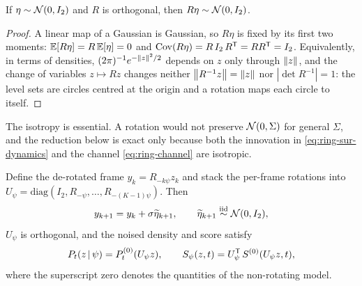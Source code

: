 \begin{lemma}
\label{lem:ring-isotropy}
If $\eta \sim \mathcal{N}(0, I_2)$ and $R$ is orthogonal, then $R\eta \sim \mathcal{N}(0,I_2)$.
\end{lemma}

\begin{proof}
A linear map of a Gaussian is Gaussian, so $R\eta$ is fixed by its first two
moments: $\mathbb{E}[R\eta] = R\,\mathbb{E}[\eta] = 0$ and
$\mathrm{Cov}(R\eta) = R\, I_2\, R^{\mathsf{T}} = R R^{\mathsf{T}} = I_2$. Equivalently, in
terms of densities, $(2\pi)^{-1}e^{-\left\lVert z \right\rVert^2/2}$ depends on $z$ only through
$\left\lVert z \right\rVert$, and the change of variables $z \mapsto Rz$ changes neither
$\left\lVert R^{-1}z \right\rVert = \left\lVert z \right\rVert$ nor $|\det R^{-1}| = 1$: the level sets are circles
centred at the origin and a rotation maps each circle to itself.
\end{proof}

The isotropy is essential. A rotation would not preserve $\mathcal{N}(0,\Sigma)$ for
general $\Sigma$, and the reduction below is exact only because both the
innovation in \eqref{eq:ring-sur-dynamics} and the channel
\eqref{eq:ring-channel} are isotropic.

\begin{lemma}\label{lem:ring-gauge}
Define the de-rotated frame $y_k = R_{-k\psi} z_k$ and stack the per-frame
rotations into
$U_\psi = \mathrm{diag}(I_2, R_{-\psi}, \dots, R_{-(K-1)\psi})$. Then
\begin{equation}
  y_{k+1} = y_k + \sigma \widetilde\eta_{k+1} ,
  \qquad \widetilde\eta_{k+1} \stackrel{\text{iid}}{\sim} \mathcal{N}(0, I_2) ,
  \label{eq:ring-gauged-rw}
\end{equation}
$U_\psi$ is orthogonal, and the noised density and score satisfy
\begin{equation}
  P_t(z \,|\, \psi) = P^{(0)}_t(U_\psi z) ,
  \qquad
  S_\psi(z,t) = U_\psi^{\mathsf{T}}\, S^{(0)}(U_\psi z, t) ,
  \label{eq:ring-gauge-score}
\end{equation}
where the superscript zero denotes the quantities of the non-rotating model.
\end{lemma}

